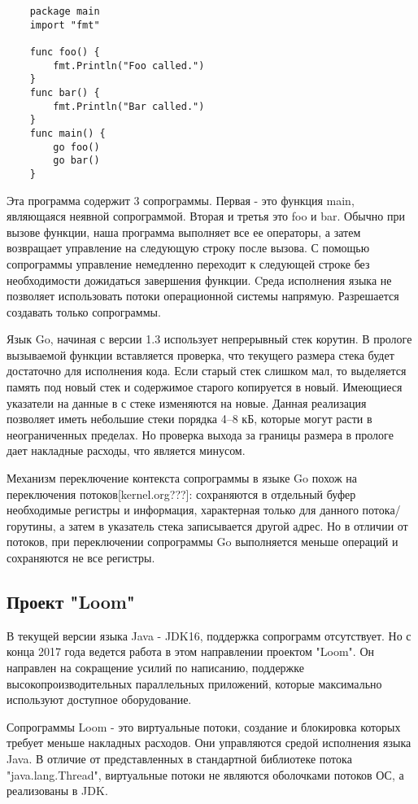 	\begin{lstlisting}
	package main
	import "fmt"
	
	func foo() {
		fmt.Println("Foo called.")
	}
	func bar() {
		fmt.Println("Bar called.")
	}
	func main() {
		go foo()
		go bar()
	}

	\end{lstlisting}
		
	Эта программа содержит 3 сопрограммы. Первая - это функция main, являющаяся
	неявной сопрограммой. Вторая и третья это foo и bar. Обычно при вызове функции, наша программа 
	выполняет все ее операторы, а затем возвращает управление на следующую строку после вызова. 
	С помощью сопрограммы управление немедленно переходит к следующей строке без необходимости дожидаться завершения функции. Cреда исполнения языка не позволяет использовать потоки операционной системы
	напрямую. Разрешается создавать только сопрограммы.
	\par
	Язык Go, начиная с версии 1.3 использует непрерывный стек корутин. В прологе вызываемой функции вставляется проверка,
	что текущего размера стека будет достаточно для исполнения кода. Если старый стек слишком мал,
	то выделяется память под новый стек и содержимое старого копируется в новый. Имеющиеся указатели на
	данные в с стеке изменяются на новые. Данная реализация позволяет иметь небольшие стеки порядка 4--8 кБ, которые
	могут расти в неограниченных пределах. Но проверка выхода за границы размера в прологе дает накладные расходы,
	что является минусом.
	\par 
	Механизм переключение контекста сопрограммы в языке Go похож на переключения потоков[kernel.org???]:
	сохраняются в отдельный буфер необходимые регистры и информация, характерная только для данного
	потока/горутины, а затем в указатель стека записывается другой адрес. Но в отличии от потоков, 
	при переключении сопрограммы Go выполняется меньше операций и сохраняются не все регистры\cite{go-context}.
	
	\subsection{Проект "Loom"}
	В текущей версии языка Java - JDK16, поддержка сопрограмм отсутствует. Но с конца 2017 года ведется 
	работа в этом направлении проектом "Loom". Он направлен на сокращение усилий по написанию, поддержке
	высокопроизводительных параллельных приложений, которые максимально используют доступное оборудование\cite{loom-main}.
	\par
	Сопрограммы Loom - это виртуальные потоки, создание и блокировка которых требует меньше накладных расходов\cite{loom-main}. Они управляются средой исполнения языка Java. 
	В отличие от представленных в стандартной библиотеке потока "java.lang.Thread", виртуальные потоки не являются
	оболочками потоков ОС, а реализованы в JDK.
	
